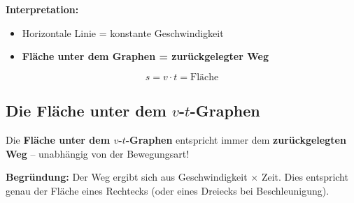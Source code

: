 \documentclass[11pt, a4paper]{article}
\newcommand{\wichtig}[1]{\textcolor{physik}{\textbf{#1}}}
\begin{document}
\begin{minipage}{0.55\textwidth}
\end{minipage}
\hfill
\begin{minipage}{0.4\textwidth}
\textbf{Interpretation:}
\begin{itemize}[leftmargin=1em]
    \item Horizontale Linie = konstante Geschwindigkeit
    \item \wichtig{Fläche unter dem Graphen = zurückgelegter Weg}
\end{itemize}

$$s = v \cdot t = \text{Fläche}$$
\end{minipage}

\subsection{Die Fläche unter dem $v$-$t$-Graphen}

\begin{merksatz}
Die \wichtig{Fläche unter dem $v$-$t$-Graphen} entspricht immer dem \wichtig{zurückgelegten Weg} -- unabhängig von der Bewegungsart!
\end{merksatz}

\textbf{Begründung:} Der Weg ergibt sich aus Geschwindigkeit $\times$ Zeit. Dies entspricht genau der Fläche eines Rechtecks (oder eines Dreiecks bei Beschleunigung).
\end{document}
